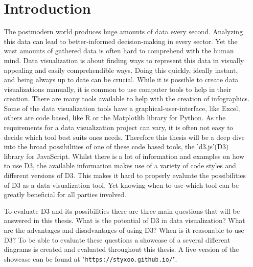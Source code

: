 \chapter{Introduction}


The postmodern world produces huge amounts of data every second. Analyzing this data can lead to better-informed decision-making in every sector. Yet the wast amounts of gathered data is often hard to comprehend with the human mind. Data visualization is about finding ways to represent this data in visually appealing and easily comprehendible ways\cite{sadiku2016data}. Doing this quickly, ideally instant, and being always up to date can be crucial. While it is possible to create data visualizations manually, it is common to use computer tools to help in their creation. There are many tools available to help with the creation of infographics. Some of the data visualization tools have a graphical-user-interface, like Excel\cite{excel}, others are code based, like R\cite{r} or the Matplotlib\cite{matplotlib} library for Python. As the requirements for a data visualization project can vary, it is often not easy to decide which tool best suits ones needs. Therefore this thesis will be a deep dive into the broad possibilities of one of these code based tools, the 'd3.js'(D3) library for JavaScript. Whilst there is a lot of information and examples on how to use D3, the available information makes use of a variety of code styles and different versions of D3. This makes it hard to properly evaluate the possibilities of D3 as a data visualization tool. Yet knowing when to use which tool can be greatly beneficial for all parties involved.

To evaluate D3 and its possibilities there are three main questions that will be answered in this thesis. What is the potential of D3 in data visualization? What are the advantages and disadvantages of using D3? When is it reasonable to use D3? To be able to evaluate these questions a showcase of a several different diagrams is created and evaluated throughout this thesis. A live version of the showcase can be found at "\verb|https://styxoo.github.io/|".

